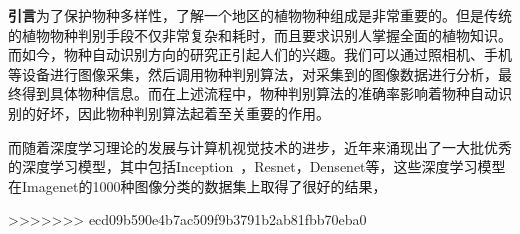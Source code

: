 \documentclass[a4paper]{ctexart} %
\begin{document}
\textbf{引言}\quad 为了保护物种多样性，了解一个地区的植物物种组成是非常重要的。但是传统的植物物种判别手段不仅非常复杂和耗时，而且要求识别人掌握全面的植物知识。而如今，物种自动识别方向的研究正引起人们的兴趣。我们可以通过照相机、手机等设备进行图像采集，然后调用物种判别算法，对采集到的图像数据进行分析，最终得到具体物种信息。而在上述流程中，物种判别算法的准确率影响着物种自动识别的好坏，因此物种判别算法起着至关重要的作用。

而随着深度学习理论的发展与计算机视觉技术的进步，近年来涌现出了一大批优秀的深度学习模型，其中包括Inception~\parencite{A01}，Resnet，Densenet等，这些深度学习模型在Imagenet的1000种图像分类的数据集上取得了很好的结果，

\printbibliography
>>>>>>> ecd09b590e4b7ac509f9b3791b2ab81fbb70eba0
\end{document}
